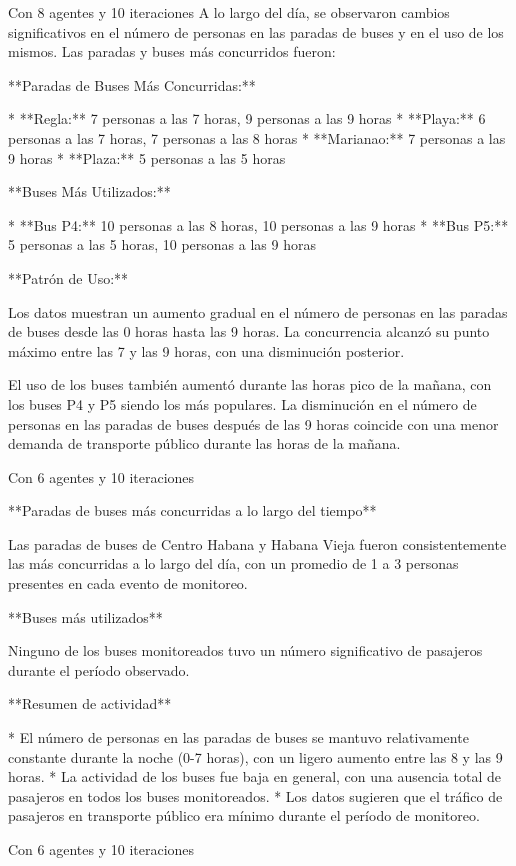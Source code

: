 \documentclass{article}
\begin{document}
Con 8 agentes y 10 iteraciones
A lo largo del día, se observaron cambios significativos en el número de personas en las paradas de buses y en el uso de los mismos. Las paradas y buses más concurridos fueron:

**Paradas de Buses Más Concurridas:**

* **Regla:** 7 personas a las 7 horas, 9 personas a las 9 horas
* **Playa:** 6 personas a las 7 horas, 7 personas a las 8 horas
* **Marianao:** 7 personas a las 9 horas
* **Plaza:** 5 personas a las 5 horas

**Buses Más Utilizados:**

* **Bus P4:** 10 personas a las 8 horas, 10 personas a las 9 horas
* **Bus P5:** 5 personas a las 5 horas, 10 personas a las 9 horas

**Patrón de Uso:**

Los datos muestran un aumento gradual en el número de personas en las paradas de buses desde las 0 horas hasta las 9 horas. La concurrencia alcanzó su punto máximo entre las 7 y las 9 horas, con una disminución posterior.

El uso de los buses también aumentó durante las horas pico de la mañana, con los buses P4 y P5 siendo los más populares. La disminución en el número de personas en las paradas de buses después de las 9 horas coincide con una menor demanda de transporte público durante las horas de la mañana.


Con 6 agentes y 10 iteraciones

**Paradas de buses más concurridas a lo largo del tiempo**

Las paradas de buses de Centro Habana y Habana Vieja fueron consistentemente las más concurridas a lo largo del día, con un promedio de 1 a 3 personas presentes en cada evento de monitoreo.

**Buses más utilizados**

Ninguno de los buses monitoreados tuvo un número significativo de pasajeros durante el período observado.

**Resumen de actividad**

* El número de personas en las paradas de buses se mantuvo relativamente constante durante la noche (0-7 horas), con un ligero aumento entre las 8 y las 9 horas.
* La actividad de los buses fue baja en general, con una ausencia total de pasajeros en todos los buses monitoreados.
* Los datos sugieren que el tráfico de pasajeros en transporte público era mínimo durante el período de monitoreo.

Con 6 agentes y 10 iteraciones
\end{document}
